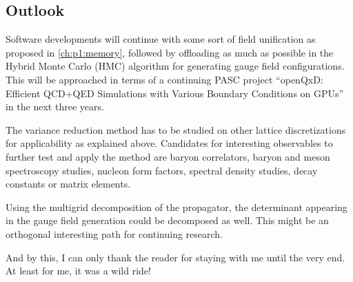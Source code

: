\subsection{Outlook}

Software developments will continue with some sort of field unification as proposed in \cref{ch:p1:memory}, followed by offloading as much as possible in the Hybrid Monte Carlo (HMC) algorithm for generating gauge field configurations.
This will be approached in terms of a continuing PASC project ``openQxD: Efficient QCD+QED Simulations with Various Boundary Conditions on GPUs''~\cite{online:pasc2025} in the next three years.

The variance reduction method has to be studied on other lattice discretizations for applicability as explained above.
Candidates for interesting observables to further test and apply the method are baryon correlators, baryon and meson spectroscopy studies, nucleon form factors, spectral density studies, decay constants or matrix elements.

Using the multigrid decomposition of the propagator, the determinant appearing in the gauge field generation could be decomposed as well.
This might be an orthogonal interesting path for continuing research.

And by this, I can only thank the reader for staying with me until the very end.
At least for me, it was a wild ride!

